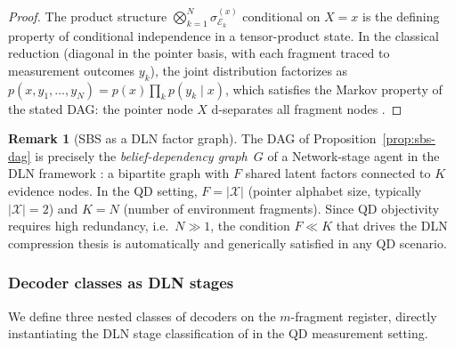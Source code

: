 \documentclass[11pt]{article}
\newcommand{\cE}{\mathcal{E}}
\newcommand{\cX}{\mathcal{X}}
\newcommand{\1}{\mathbf{1}}
\theoremstyle{definition}
\newtheorem{remark}{Remark}
\theoremstyle{plain}
\begin{document}
\begin{proof}
The product structure
$\bigotimes_{k=1}^{N}\sigma^{(x)}_{\cE_k}$ conditional on $X=x$ is the
defining property of conditional independence in a tensor-product state.
In the classical reduction (diagonal in the pointer basis, with each
fragment traced to measurement outcomes $y_k$), the joint distribution
factorizes as
$p(x,y_1,\dots,y_N)=p(x)\prod_k p(y_k\mid x)$,
which satisfies the Markov property of the stated DAG:
the pointer node $X$ d-separates all fragment nodes
\citep{Pearl1988}.
\end{proof}

\begin{remark}[SBS as a DLN factor graph]
\label{rem:sbs-factor}
The DAG of Proposition~\ref{prop:sbs-dag} is precisely the
\emph{belief-dependency graph}~$G$ of a Network-stage agent in the DLN
framework \citep[Sec.~2.1]{WuDLNCompression2026preprint}: a bipartite
graph with $F$ shared latent factors connected to $K$ evidence nodes.
In the QD setting, $F=|\cX|$ (pointer alphabet size, typically
$|\cX|=2$) and $K=N$ (number of environment fragments).
Since QD objectivity requires high redundancy, i.e.\ $N\gg 1$, the
condition $F \ll K$ that drives the DLN compression thesis is
automatically and generically satisfied in any QD scenario.
\end{remark}


\subsubsection{Decoder classes as DLN stages}

We define three nested classes of decoders on the $m$-fragment register,
directly instantiating the DLN stage classification of
\citep[Sec.~2.1]{WuDLNCompression2026preprint} in the QD measurement
setting.
\end{document}
